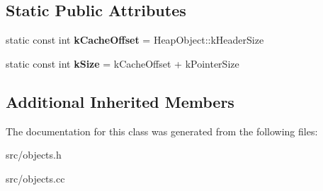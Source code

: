 \subsection*{Static Public Attributes}
\begin{DoxyCompactItemize}
\item 
\hypertarget{classv8_1_1internal_1_1_polymorphic_code_cache_aea414cbcd476b3a9a2deae6daa1aae12}{}static const int {\bfseries k\+Cache\+Offset} = Heap\+Object\+::k\+Header\+Size\label{classv8_1_1internal_1_1_polymorphic_code_cache_aea414cbcd476b3a9a2deae6daa1aae12}

\item 
\hypertarget{classv8_1_1internal_1_1_polymorphic_code_cache_ab690080d950ca658e508934ce92145d3}{}static const int {\bfseries k\+Size} = k\+Cache\+Offset + k\+Pointer\+Size\label{classv8_1_1internal_1_1_polymorphic_code_cache_ab690080d950ca658e508934ce92145d3}

\end{DoxyCompactItemize}
\subsection*{Additional Inherited Members}


The documentation for this class was generated from the following files\+:\begin{DoxyCompactItemize}
\item 
src/objects.\+h\item 
src/objects.\+cc\end{DoxyCompactItemize}
